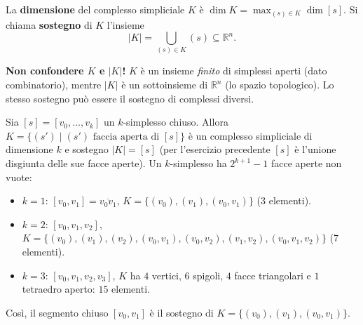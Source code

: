 \begin{definicion}
La \textbf{dimensione} del complesso simpliciale $K$ \`e $\dim K = \max_{(s) \in K} \dim [s]$. Si chiama \textbf{sostegno} di $K$ l'insieme
\[
|K| = \bigcup_{(s) \in K} (s) \subseteq \mathbb{R}^n .
\]
\end{definicion}

\begin{observacion}
\textbf{Non confondere $K$ e $|K|$!} $K$ \`e un insieme \emph{finito} di simplessi aperti (dato combinatorio), mentre $|K|$ \`e un sottoinsieme di $\mathbb{R}^n$ (lo spazio topologico). Lo stesso sostegno pu\`o essere il sostegno di complessi diversi.
\end{observacion}

\begin{ejemplo}
Sia $[s] = [v_0, \dots, v_k]$ un $k$-simplesso chiuso. Allora $K = \{ (s') \mid (s') \text{ faccia aperta di } [s] \}$ \`e un complesso simpliciale di dimensione $k$ e sostegno $|K| = [s]$ (per l'esercizio precedente $[s]$ \`e l'unione disgiunta delle sue facce aperte). Un $k$-simplesso ha $2^{k+1} - 1$ facce aperte non vuote:
\begin{itemize}
    \item $k = 1$: $[v_0, v_1] = \overline{v_0 v_1}$, $K = \{ (v_0), (v_1), (v_0, v_1) \}$ (3 elementi).
    \item $k = 2$: $[v_0, v_1, v_2]$, $K = \{ (v_0), (v_1), (v_2), (v_0, v_1), (v_0, v_2), (v_1, v_2), (v_0, v_1, v_2) \}$ (7 elementi).
    \item $k = 3$: $[v_0, v_1, v_2, v_3]$, $K$ ha $4$ vertici, $6$ spigoli, $4$ facce triangolari e $1$ tetraedro aperto: $15$ elementi.
\end{itemize}
Cos\`i, il segmento chiuso $[v_0, v_1]$ \`e il sostegno di $K = \{ (v_0), (v_1), (v_0,v_1) \}$.
\end{ejemplo}

